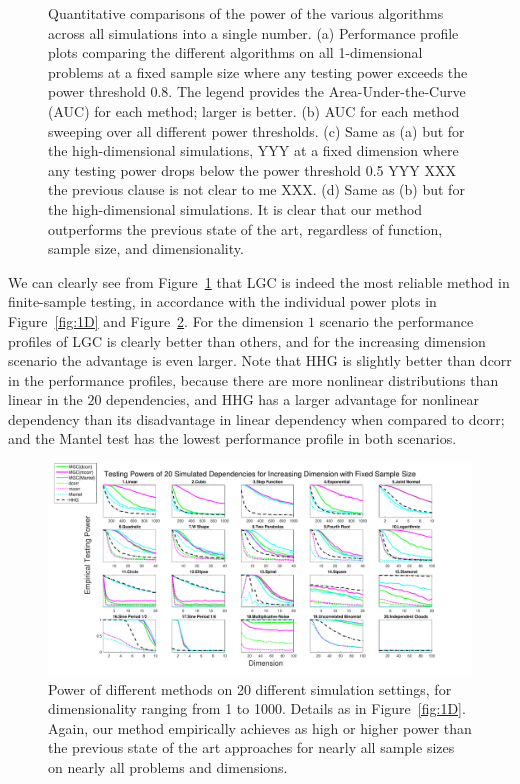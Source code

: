 \documentclass[11pt]{article}
\begin{document}
\begin{figure}[htbp]
{}
\caption{Quantitative comparisons of the power of the various algorithms across all simulations into a single number.  
(a) Performance profile plots comparing the different algorithms on all 1-dimensional problems at a fixed sample size where any testing power exceeds the power threshold 0.8. The legend provides the Area-Under-the-Curve (AUC) for each method; larger is better.
(b) AUC for each method sweeping over all different power thresholds.
(c) Same as (a) but for the high-dimensional simulations, YYY at a fixed dimension where any testing power drops below the power threshold 0.5 YYY XXX the previous clause is not clear to me XXX.
(d) Same as (b) but for the high-dimensional simulations.
It is clear that our method outperforms the previous state of the art, regardless of function, sample size, and dimensionality.}
\label{fig:pp}
\end{figure}

We can clearly see from Figure~\ref{fig:pp} that LGC is indeed the most reliable method in finite-sample testing, in accordance with the individual power plots in Figure~\ref{fig:1D} and Figure~\ref{fig:nD}. For the dimension $1$ scenario the performance profiles of LGC is clearly better than others, and for the increasing dimension scenario the advantage is even larger. Note that HHG is slightly better than dcorr in the performance profiles, because there are more nonlinear distributions than linear in the $20$ dependencies, and HHG has a larger advantage for nonlinear dependency than its disadvantage in linear dependency when compared to dcorr; and the Mantel test has the lowest performance profile in both scenarios. 




\begin{figure}[htbp]
\includegraphics[width=1.0\textwidth]{../Figures/Fig5}
\caption{Power of different methods on 20 different simulation settings, for dimensionality ranging from 1 to 1000.  Details as in Figure~\ref{fig:1D}.
Again, our method empirically achieves as high or higher power than the previous state of the art approaches for nearly all sample sizes on nearly all problems and dimensions.
}
\label{fig:nD}
\end{figure}
\end{document}
